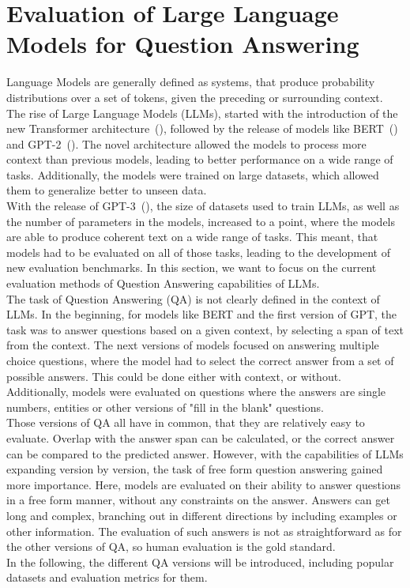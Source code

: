 \section{Evaluation of Large Language Models for Question Answering}\label{sec:evaluation-of-large-language-models}
Language Models are generally defined as systems, that produce probability distributions over a set of tokens, given the preceding or surrounding context.
The rise of Large Language Models (LLMs), started with the introduction of the new Transformer architecture~(\cite{vaswani:2017}), followed by the release of models like BERT~(\cite{devlin:2018}) and GPT-2~(\cite{radford:2018}).
The novel architecture allowed the models to process more context than previous models, leading to better performance on a wide range of tasks.
Additionally, the models were trained on large datasets, which allowed them to generalize better to unseen data.
\\
With the release of GPT-3~(\cite{brown:2020}), the size of datasets used to train LLMs, as well as the number of parameters in the models, increased to a point, where the models are able to produce coherent text on a wide range of tasks.
This meant, that models had to be evaluated on all of those tasks, leading to the development of new evaluation benchmarks.
In this section, we want to focus on the current evaluation methods of Question Answering capabilities of LLMs.
\\
The task of Question Answering (QA) is not clearly defined in the context of LLMs.
In the beginning, for models like BERT and the first version of GPT, the task was to answer questions based on a given context, by selecting a span of text from the context.
The next versions of models focused on answering multiple choice questions, where the model had to select the correct answer from a set of possible answers.
This could be done either with context, or without.
Additionally, models were evaluated on questions where the answers are single numbers, entities or other versions of "fill in the blank" questions.
\\
Those versions of QA all have in common, that they are relatively easy to evaluate.
Overlap with the answer span can be calculated, or the correct answer can be compared to the predicted answer.
However, with the capabilities of LLMs expanding version by version, the task of free form question answering gained more importance.
Here, models are evaluated on their ability to answer questions in a free form manner, without any constraints on the answer.
Answers can get long and complex, branching out in different directions by including examples or other information.
The evaluation of such answers is not as straightforward as for the other versions of QA, so human evaluation is the gold standard.
\\
In the following, the different QA versions will be introduced, including popular datasets and evaluation metrics for them.

